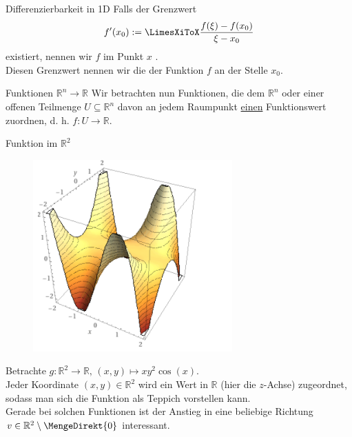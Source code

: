 \begin{Wiederholung}
{Differenzierbarkeit in 1D}
Falls der Grenzwert
\begin{equation*}
    f'(x_0):=\LimesXiToX \frac{f(\xi)-f(x_0)}{\xi-x_0}
\end{equation*}
existiert, nennen wir $f$ im Punkt $x$ .\\
Diesen Grenzwert nennen wir die  der Funktion $f$ an der Stelle $x_0$.
\end{Wiederholung}
\begin{Def}
{Funktionen $\mathbb{R}^n\to\mathbb{R}$}
Wir betrachten nun Funktionen, die dem $\mathbb{R}^n$ oder einer offenen Teilmenge $U\subseteq \mathbb{R}^n$ davon an jedem Raumpunkt \underline{einen} Funktionswert zuordnen, d. h. $f:U\to \mathbb{R}$.
\end{Def}
\begin{Beispiel}
{Funktion im $\mathbb{R}^2$}
\begin{figure}
 \vspace{-15pt}
\includegraphics[width=.15\textwidth]{Dateien/07/07Konturplot.PNG}
 \vspace{-15pt}
\end{figure}
Betrachte $g:\mathbb{R}^2\to\mathbb{R},\,(x,y)\mapsto xy^2\cos(x)$.\\
Jeder Koordinate $(x,y)\in\mathbb{R}^2$ wird ein Wert in $\mathbb{R}$ (hier die $z$-Achse) zugeordnet, sodass man sich die Funktion als Teppich vorstellen kann.\\
Gerade bei solchen Funktionen ist der Anstieg in eine beliebige Richtung $v\in\mathbb{R}^2\setminus\MengeDirekt{0}$ interessant.
\end{Beispiel}

